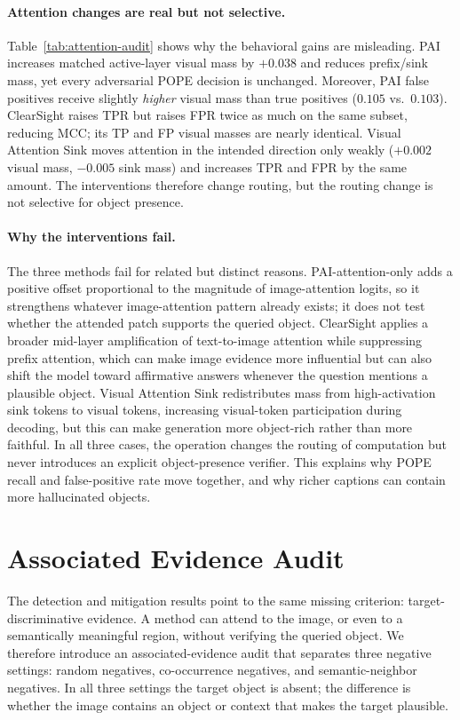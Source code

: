 \documentclass[letterpaper]{article} \usepackage[submission]{aaai2027}  \usepackage[hyphens]{url}  \usepackage{graphicx} \urlstyle{rm} \def\UrlFont{\rm}  \usepackage{natbib}  \usepackage{caption} \frenchspacing
\begin{document}
\paragraph{Attention changes are real but not selective.} Table~\ref{tab:attention-audit} shows why the behavioral gains are misleading. PAI increases matched active-layer visual mass by $+0.038$ and reduces prefix/sink mass, yet every adversarial POPE decision is unchanged. Moreover, PAI false positives receive slightly \emph{higher} visual mass than true positives ($0.105$ vs.\ $0.103$). ClearSight raises TPR but raises FPR twice as much on the same subset, reducing MCC; its TP and FP visual masses are nearly identical. Visual Attention Sink moves attention in the intended direction only weakly ($+0.002$ visual mass, $-0.005$ sink mass) and increases TPR and FPR by the same amount. The interventions therefore change routing, but the routing change is not selective for object presence.

\paragraph{Why the interventions fail.} The three methods fail for related but distinct reasons. PAI-attention-only adds a positive offset proportional to the magnitude of image-attention logits, so it strengthens whatever image-attention pattern already exists; it does not test whether the attended patch supports the queried object. ClearSight applies a broader mid-layer amplification of text-to-image attention while suppressing prefix attention, which can make image evidence more influential but can also shift the model toward affirmative answers whenever the question mentions a plausible object. Visual Attention Sink redistributes mass from high-activation sink tokens to visual tokens, increasing visual-token participation during decoding, but this can make generation more object-rich rather than more faithful. In all three cases, the operation changes the routing of computation but never introduces an explicit object-presence verifier. This explains why POPE recall and false-positive rate move together, and why richer captions can contain more hallucinated objects.
 \section{Associated Evidence Audit}
\label{sec:associated-audit}

\noindent The detection and mitigation results point to the same missing criterion: target-discriminative evidence. A method can attend to the image, or even to a semantically meaningful region, without verifying the queried object. We therefore introduce an associated-evidence audit that separates three negative settings: random negatives, co-occurrence negatives, and semantic-neighbor negatives. In all three settings the target object is absent; the difference is whether the image contains an object or context that makes the target plausible.
\end{document}
